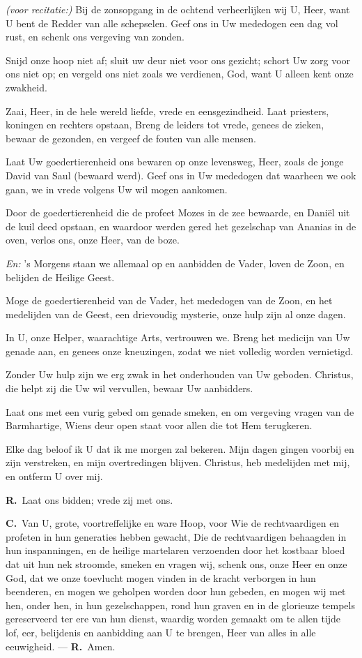 \documentclass[12pt,twoside,a5paper]{article}
\newlength{\origparskip}
\newenvironment{halfparskip}{
  \setlength{\parskip}{0.5\origparskip}
}{
  \setlength{\parskip}{\origparskip}
}
\newcommand{\cc}{{\color{BrickRed} \textbf{C.}}}
\newcommand{\rr}{{\color{BrickRed} \textbf{R.}}}
\newcommand{\liturgicalhint}[1]{{\color{BrickRed}\footnotesize\itshape{#1}}}
\begin{document}
\begin{halfparskip}
  \liturgicalhint{(voor recitatie:)}  Bij de zonsopgang in de ochtend verheerlijken wij U, Heer, want U bent de Redder van alle schepselen. Geef ons in Uw mededogen een dag vol rust, en schenk ons vergeving van zonden.

  Snijd onze hoop niet af; sluit uw deur niet voor ons gezicht; schort Uw zorg voor ons niet op; en vergeld ons niet zoals we verdienen, God, want U alleen kent onze zwakheid.

  Zaai, Heer, in de hele wereld liefde, vrede en eensgezindheid. Laat priesters, koningen en rechters opstaan, Breng de leiders tot vrede, genees de zieken, bewaar de gezonden, en vergeef de fouten van alle mensen.

  Laat Uw goedertierenheid ons bewaren op onze levensweg, Heer, zoals de jonge David van Saul (bewaard werd). Geef ons in Uw mededogen dat waarheen we ook gaan, we in vrede volgens Uw wil mogen aankomen.

  Door de goedertierenheid die de profeet Mozes in de zee bewaarde, en Daniël uit de kuil deed opstaan, en waardoor werden gered het gezelschap van Ananias in de oven, verlos ons, onze Heer, van de boze.

  \liturgicalhint{En:} 's Morgens staan we allemaal op en aanbidden de Vader, loven de Zoon, en belijden de Heilige Geest.

  Moge de goedertierenheid van de Vader, het mededogen van de Zoon, en het medelijden van de Geest, een drievoudig mysterie, onze hulp zijn al onze dagen.

  In U, onze Helper, waarachtige Arts, vertrouwen we. Breng het medicijn van Uw genade aan, en genees onze kneuzingen, zodat we niet volledig worden vernietigd.

  Zonder Uw hulp zijn we erg zwak in het onderhouden van Uw geboden. Christus, die helpt zij die Uw wil vervullen, bewaar Uw aanbidders.

  Laat ons met een vurig gebed om genade smeken, en om vergeving vragen van de Barmhartige, Wiens deur open staat voor allen die tot Hem terugkeren.

  Elke dag beloof ik U dat ik me morgen zal bekeren. Mijn dagen gingen voorbij en zijn verstreken, en mijn overtredingen blijven. Christus, heb medelijden met mij, en ontferm U over mij.

  \rr\ Laat ons bidden; vrede zij met ons.

  \cc\ Van U, grote, voortreffelijke en ware Hoop, voor Wie de rechtvaardigen en profeten in hun generaties hebben gewacht, Die de rechtvaardigen behaagden in hun inspanningen, en de heilige martelaren verzoenden door het kostbaar bloed dat uit hun nek stroomde, smeken en vragen wij, schenk ons, onze Heer en onze God, dat we onze toevlucht mogen vinden in de kracht verborgen in hun beenderen, en mogen we geholpen worden door hun gebeden, en mogen wij met hen, onder hen, in hun gezelschappen, rond hun graven en in de glorieuze tempels gereserveerd ter ere van hun dienst, waardig worden gemaakt om te allen tijde lof, eer, belijdenis en aanbidding aan U te brengen, Heer van alles in alle eeuwigheid. --- \rr\ Amen.


\end{halfparskip}
\end{document}
